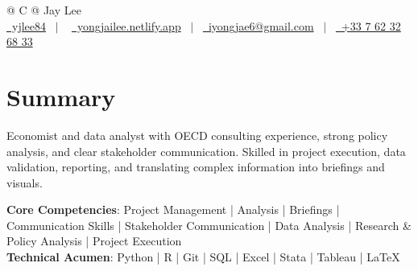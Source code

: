 \documentclass[a4paper,12pt]{article}
\begin{document}
\pagestyle{empty} 



\begin{tabularx}{\linewidth}{@{} C @{}}
\Huge{Jay Lee} \\[7.5pt]
\href{https://github.com/yjlee84}{\raisebox{-0.05\height}\faGithub\ yjlee84} \ $|$ \ 
\href{https://yongjailee.netlify.app}{\raisebox{-0.05\height}\faGlobe \ yongjailee.netlify.app} \ $|$ \ 
\href{mailto:email@mysite.com}{\raisebox{-0.05\height}\faEnvelope \ iyongjae6@gmail.com} \ $|$ \ 
\href{tel:+000000000000}{\raisebox{-0.05\height}\faMobile \ +33 7 62 32 68 33} \\
\end{tabularx}


\section{Summary}
Economist and data analyst with OECD consulting experience, strong policy analysis, and clear stakeholder communication. Skilled in project execution, data validation, reporting, and translating complex information into briefings and visuals.

\textbf{Core Competencies}: Project Management | Analysis | Briefings | Communication Skills | Stakeholder Communication | Data Analysis | Research \& Policy Analysis | Project Execution\\
\textbf{Technical Acumen}: Python | R | Git | SQL | Excel | Stata | Tableau | \LaTeX{}
\end{document}
